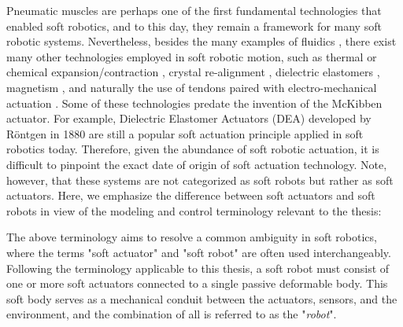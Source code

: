 Pneumatic muscles are perhaps one of the first fundamental technologies that enabled soft robotics, and to this day, they remain a framework for many soft robotic systems. Nevertheless, besides the many examples of fluidics \cite{Marchese2014,Marchese2016,Katzschmann2018,Suzumori1991,Mosadegh2014}, there exist many other technologies employed in soft robotic motion, such as thermal \cite{Wu2021Dec} or chemical expansion/contraction \cite{Tolley2014,Bartlett2015,Wehner2016}, crystal re-alignment \cite{Pilz2020,Lopez2018,Vantomme2021,Polygerinos2013}, dielectric elastomers \cite{Keplinger2011}, magnetism \cite{Roh2019Apr,KimYoonho2018,McDonald2020,Boyvat2017Jul}, and naturally the use of tendons paired with electro-mechanical actuation \cite{Renda2018,Bern2019,Kim2020Jun,Coevoet2017Feb,Wang2016Sep}. Some of these technologies predate the invention of the McKibben actuator. For example, Dielectric Elastomer Actuators (DEA) developed by R\"{o}ntgen in 1880 \cite{Rontgen1880} are still a popular soft actuation principle applied in soft robotics today. Therefore, given the abundance of soft robotic actuation, it is difficult to pinpoint the exact date of origin of soft actuation technology. Note, however, that these systems are not categorized as soft robots but rather as soft actuators. Here, we emphasize the difference between soft actuators and soft robots in view of the modeling and control terminology relevant to the thesis:
%
%
\begin{rmk} The above terminology aims to resolve a common ambiguity in soft robotics, where the terms "soft actuator" and "soft robot" are often used interchangeably. Following the terminology applicable to this thesis, a soft robot must consist of one or more soft actuators connected to a single passive deformable body. This soft body serves as a mechanical conduit between the actuators, sensors, and the environment, and the combination of all is referred to as the "\emph{robot}". 
\end{rmk}
\vspace{-3mm}
